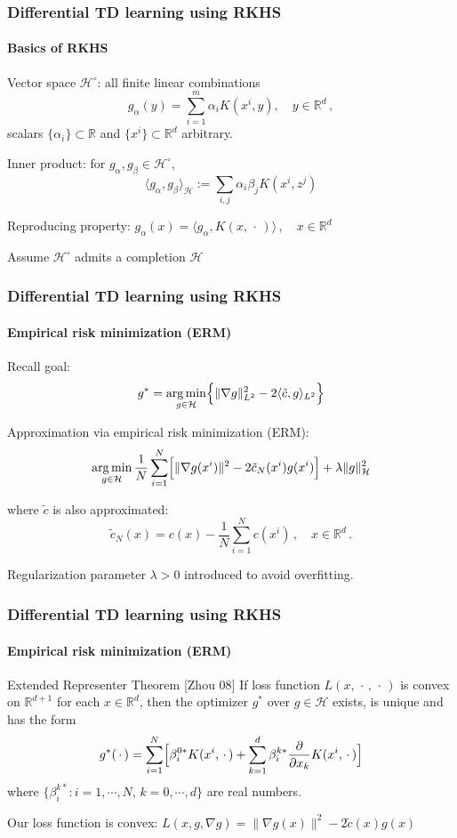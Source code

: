 \documentclass[xcolor=dvipsnames, subsection=false]{beamer}
\def\alertb#1{\alert{\color{BrickRed}  #1}}
\def\alertb#1{\alert{\color{BrickRed}  #1}}
\def\clH{{\mathcal H}}
\def\tilc{\tilde c}
\newcommand{\field}[1]{\mathbb{#1}}
\def\Re{\field{R}}
\def\varble{\,\cdot\,}
\def\argmin{\mathop{\rm arg\, min}}
\def\eqdef{\mathbin{:=}}
\def\bl#1{{\color{blue}#1}}
\begin{document}
\begin{frame}
\frametitle{Differential TD learning using RKHS}
\framesubtitle{Basics of RKHS}
\begin{minipage}[t][6.5cm][t]{\textwidth}
	\alertb{Vector space $\clH^\circ$:}     all finite linear combinations
	\[
	 g_\alpha(y)  =\sum_{i=1}^m  \alpha_i K(x^i, y),  \quad y\in\Re^d \,,
	\]
	\hfill   scalars $\{\alpha_i\}  \subset \Re $ and   $\{x^i\} \subset\Re^d$   arbitrary.
	\smallskip
	
	\alertb{Inner product:} for $g_\alpha , g_\beta \in \clH^\circ$,
	\[
	\langle g_\alpha , g_\beta\rangle_\clH \eqdef \sum_{i,j}\alpha_i \beta_j K(x^i, z^j)
	\]
	
	\smallskip
	
	\alertb{Reproducing property:} $	g_\alpha(x)  = \langle g_\alpha , K(x,\varble) \rangle\,, \quad x\in \Re^d $
	\vfill
	\centerline{Assume $\clH^\circ$ admits a completion $\clH$}
\end{minipage}
\end{frame}

\begin{frame}
\frametitle{Differential TD learning using RKHS}
\framesubtitle{Empirical risk minimization (ERM)}

\begin{minipage}[t][6.5cm][t]{\textwidth}
	
	Recall goal:
	\[
	g^* = \argmin_{g\in \clH}   \Bigl\{   \|\nabla g  \|_{L^2}^2   -  2 \langle  \tilc,   g \rangle_{L^2}   \Bigr\}
	\]
	
	Approximation via \alertb{empirical risk minimization (ERM)}:
	\[
	\argmin_{g \in \clH} \frac{1}{N} \sum_{i=1}^N\Bigl[ \| \nabla g(x^i) \|^2 - 2 \tilc_N(x^i)g(x^i)\Bigr] + \lambda \|g\|_\clH^2
	\]
	
	where $\tilc$ is also approximated:
	\[
	\tilc_N(x) = c(x) - \frac{1}{N}  \sum_{i=1}^N  c(x^i)\,,\quad x\in\Re^d\, .
	\]
	
	Regularization parameter $\lambda>0$   introduced to avoid overfitting.
	
\end{minipage}
\end{frame}

\begin{frame}
\frametitle{Differential TD learning using RKHS}
\framesubtitle{Empirical risk minimization (ERM)}
\begin{block}{Extended Representer Theorem \bl{[Zhou 08]}}
	If loss function
	$L(x,\varble,\varble)$ is convex   on $\Re^{d+1}$ for each $x\in\Re^d$, then the  optimizer $g^*$ over $g\in\clH$ exists, is unique and has the form
	\[
	g^*(\varble) = \sum_{i=1}^N  \Bigl[
	\beta_i^{0*}  K(x^i, \varble)   +  \sum_{k =1}^d  \beta_i^{k*} \frac{\partial}{\partial x_k}  K(x^i, \varble) \Bigr]
	\]
	where $\{\beta_i^{k*} \colon i=1,\cdots,N,\, k = 0,\cdots,d\}$ are real numbers.
\end{block}
\vfill
\pause
\centering
Our loss function is convex:   $L(x,g,\nabla g) = \| \nabla g(x)\|^2 - 2 \tilc(x) g(x)$
\end{frame}
\end{document}
